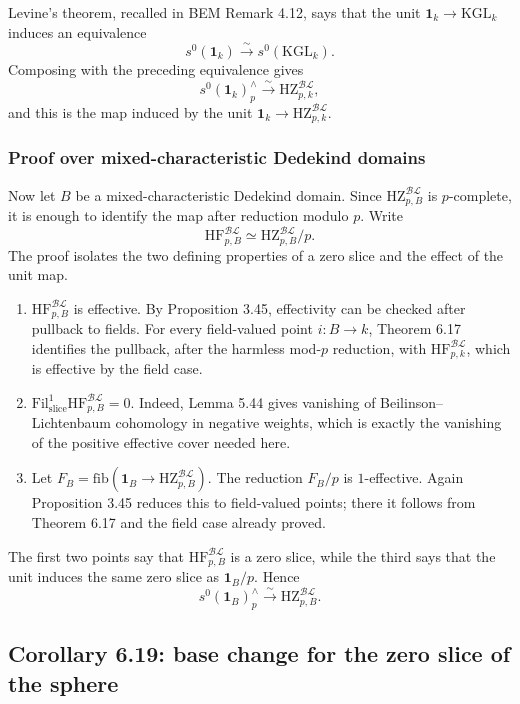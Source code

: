\documentclass[11pt,a4paper]{article}
\newcommand{\BL}{\mathcal{BL}}
\newcommand{\KGL}{\mathrm{KGL}}
\newcommand{\HZ}{\mathrm{HZ}}
\newcommand{\HF}{\mathrm{HF}}
\newcommand{\Fil}{\mathrm{Fil}}
\newcommand{\fib}{\mathrm{fib}}
\newcommand{\1}{\mathbf 1}
\newcommand{\slic}{\mathrm{slice}}
\theoremstyle{bemstyle}
\theoremstyle{definition}
\begin{document}
Levine's theorem, recalled in BEM Remark 4.12, says that the unit \(\1_k\to\KGL_k\) induces an equivalence
\[
       s^0(\1_k)\xrightarrow{\sim}s^0(\KGL_k).
\]
Composing with the preceding equivalence gives
\[
       s^0(\1_k)^{\wedge}_p\xrightarrow{\sim}\HZ^{\BL}_{p,k},
\]
and this is the map induced by the unit \(\1_k\to\HZ^{\BL}_{p,k}\).

\subsubsection{Proof over mixed-characteristic Dedekind domains}

Now let \(B\) be a mixed-characteristic Dedekind domain. Since \(\HZ^{\BL}_{p,B}\) is \(p\)-complete, it is enough to identify the map after reduction modulo \(p\). Write
\[
       \HF^{\BL}_{p,B}\simeq \HZ^{\BL}_{p,B}/p.
\]
The proof isolates the two defining properties of a zero slice and the effect of the unit map.

\begin{enumerate}
  \item \(\HF^{\BL}_{p,B}\) is effective. By Proposition 3.45, effectivity can be checked after pullback to fields. For every field-valued point \(i:B\to k\), Theorem 6.17 identifies the pullback, after the harmless mod-\(p\) reduction, with \(\HF^{\BL}_{p,k}\), which is effective by the field case.

  \item \(\Fil^1_{\slic}\HF^{\BL}_{p,B}=0\). Indeed, Lemma 5.44 gives vanishing of Beilinson--Lichtenbaum cohomology in negative weights, which is exactly the vanishing of the positive effective cover needed here.

  \item Let \(F_B=\fib(\1_B\to\HZ^{\BL}_{p,B})\). The reduction \(F_B/p\) is \(1\)-effective. Again Proposition 3.45 reduces this to field-valued points; there it follows from Theorem 6.17 and the field case already proved.
\end{enumerate}

The first two points say that \(\HF^{\BL}_{p,B}\) is a zero slice, while the third says that the unit induces the same zero slice as \(\1_B/p\). Hence
\[
       s^0(\1_B)^{\wedge}_p\xrightarrow{\sim}\HZ^{\BL}_{p,B}.
\]

\subsection{Corollary 6.19: base change for the zero slice of the sphere}
\end{document}
